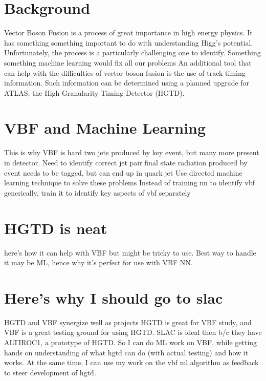 \documentclass[paper=a4,fontsize=12pt]{article}
\begin{document}
\section*{Background}
    Vector Boson Fusion is a process of great importance in high energy physics.
    It has something something important to do with understanding Higg's potential. %
    Unfortunately, the process is a particularly challenging one to identify.
    Something something machine learning would fix all our problems %
    An additional tool that can help with the difficulties of vector boson fusion is the use of track timing information. Such information can be determined using a planned upgrade for ATLAS, the High Granularity Timing Detector (HGTD).






\section*{VBF and Machine Learning}
    This is why VBF is hard
        two jets produced by key event, but many more present in detector. Need to identify correct jet pair
        final state radiation produced by event needs to be tagged, but can end up in quark jet
    Use directed machine learning technique to solve these problems
        Instead of training nn to identify vbf generically, train it to identify key aspects of vbf separately 


\section*{HGTD is neat}
    here's how it can help with VBF 
    but might be tricky to use.
    Best way to handle it may be ML,
    hence why it's perfect for use with VBF NN. 


\section*{Here's why I should go to slac}
    HGTD and VBF synergize well as projects
    HGTD is great for VBF study, and VBF is a great testing ground for using HGTD.
    SLAC is ideal then b/c they have ALTIROC1, a prototype of HGTD.
    So I can do ML work on VBF, while getting hands on understanding of what hgtd can do (with actual testing) and how it works.
    At the same time, I can use my work on the vbf ml algorithm as feedback to steer development of hgtd.
\end{document}
